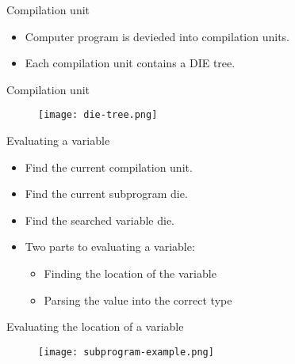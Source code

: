 \begin{frame}{Compilation unit}
	\begin{itemize}
		\item Computer program is devieded into compilation units.
		\item Each compilation unit contains a DIE tree.
	\end{itemize}
\end{frame}


\begin{frame}{Compilation unit}
	\begin{figure}
		\texttt{[image: die-tree.png]}
	\end{figure}
\end{frame}


\begin{frame}{Evaluating a variable}
	\begin{itemize}
		\item Find the current compilation unit.
		\item Find the current subprogram die.
		\item Find the searched variable die. 
		\item Two parts to evaluating a variable:
			\begin{itemize}
				\item Finding the location of the variable
				\item Parsing the value into the correct type
			\end{itemize}
	\end{itemize}
\end{frame}


\begin{frame}{Evaluating the location of a variable}
	\begin{figure}
		\texttt{[image: subprogram-example.png]}
	\end{figure}
\end{frame}


